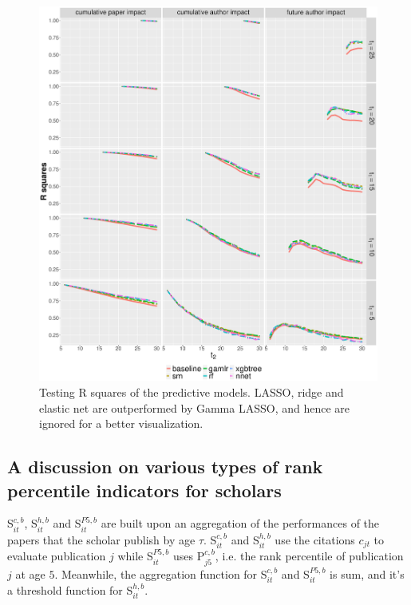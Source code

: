 \begin{figure}[ht!]
    \centering
    \includegraphics[width=\textwidth]{figures/pred_model/r2_diff.eps}
    \caption{Testing R squares of the predictive models. LASSO, ridge and elastic net are outperformed by Gamma LASSO, and hence are ignored for a better visualization.}
    \label{fig:pred_r2}
\end{figure}


\subsection*{A discussion on various types of rank percentile indicators for scholars}
S$_{it}^{c,b}$, S$_{it}^{h,b}$ and S$_{it}^{P5,b}$ are built upon an aggregation of the performances of the papers that the scholar publish by age $\tau$. S$_{it}^{c,b}$ and S$_{it}^{h,b}$ use the citations $c_{jt}$ to evaluate publication $j$ while S$_{it}^{P5,b}$ uses P$_{j5}^{c,b}$, i.e. the rank percentile of publication $j$ at age $5$. Meanwhile, the aggregation function for S$_{it}^{c,b}$ and S$_{it}^{P5,b}$ is sum, and it's a threshold function for S$_{it}^{h,b}$. 


